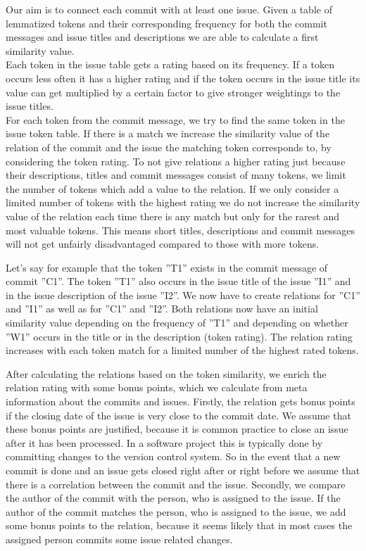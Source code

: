 Our aim is to connect each commit with at least one issue.
Given a table of lemmatized tokens and their corresponding frequency for both the commit messages and issue titles and descriptions we are able to calculate a first similarity value.\\
Each token in the issue table gets a rating based on its frequency.
If a token occurs less often it has a higher rating and if the token occurs in the issue title its value can get multiplied by a certain factor to give stronger weightings to the issue titles.\\
For each token from the commit message, we try to find the same token in the issue token table.
If there is a match we increase the similarity value of the relation of the commit and the issue the matching token corresponds to, by considering the token rating.
To not give relations a higher rating just because their descriptions, titles and commit messages consist of many tokens, we limit the number of tokens which add a value to the relation.
If we only consider a limited number of tokens with the highest rating we do not increase the similarity value of the relation each time there is any match but only for the rarest and most valuable tokens.
This means short titles, descriptions and commit messages will not get unfairly disadvantaged compared to those with more tokens.

Let's say for example that the token ''T1'' exists in the commit message of commit ''C1''.
The token ''T1'' also occurs in the issue title of the issue ''I1'' and in the issue description of the issue ''I2''.
We now have to create relations for ''C1'' and ''I1'' as well as for ''C1'' and ''I2''.
Both relations now have an initial similarity value depending on the frequency of ''T1'' and depending on whether ''W1'' occurs in the title or in the description (token rating).
The relation rating increases with each token match for a limited number of the highest rated tokens.

After calculating the relations based on the token similarity, we enrich the relation rating with some bonus points, which we calculate from meta information about the commits and issues.
Firstly, the relation gets bonus points if the closing date of the issue is very close to the commit date.
We assume that these bonus points are justified, because it is common practice to close an issue after it has been processed.
In a software project this is typically done by committing changes to the version control system.
So in the event that a new commit is done and an issue gets closed right after or right before we assume that there is a correlation between the commit and the issue.
Secondly, we compare the author of the commit with the person, who is assigned to the issue.
If the author of the commit matches the person, who is assigned to the issue, we add some bonus points to the relation, because it seems likely that in most cases the assigned person commits some issue related changes.

